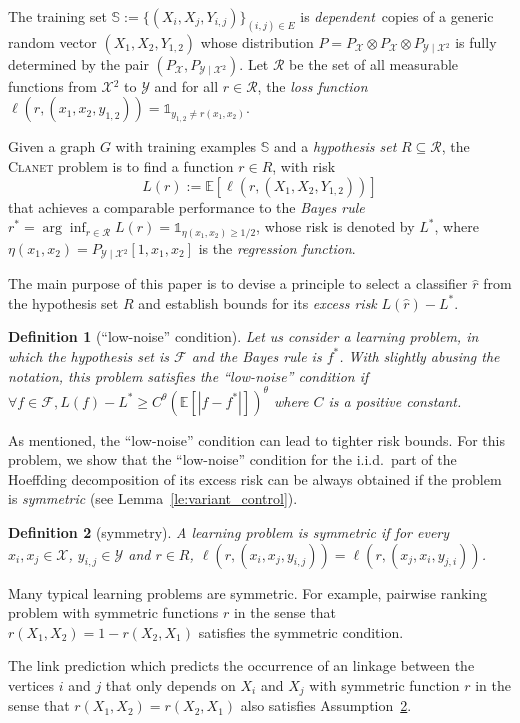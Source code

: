\documentclass[letterpaper]{article} %
\def\LongVersion{}
\def\LongVersionEnd{}
\newtheorem{definition}{Definition}
\newcommand{\E}{\mathbb{E}}
\newcommand{\indicator}{\mathds 1}
\newcommand{\xspace}{\mathcal{X}}
\newcommand{\yspace}{\mathcal{Y}}
\newcommand{\bayeserror}{L^*}
\newcommand{\distribution}{P}
\newcommand{\risk}{L}
\newcommand{\lossf}{\ell}
\newcommand{\pair}[1]{(#1)}
\newcommand{\problemabbr}{\textnormal{C}\textsc{lanet}}
\newcommand{\trainingset}{\mathbb{S}}
\begin{document}
The training set $\trainingset:=\{(X_i,X_j,Y_{i,j})\}_{\pair{i,j}\in E}$ is \emph{dependent}\ copies of a generic random vector $(X_1, X_2, Y_{1,2})$ whose distribution $\distribution{}=P_\xspace\otimes P_\xspace\otimes P_{\yspace{}\mid\xspace{}^2}$ is fully determined by the pair $(P_\xspace{}, P_{\yspace{}\mid\xspace{}^2})$. 
Let $\mathcal{R}$ be the set of all measurable functions from $\xspace{}^2$ to $\yspace{}$ and for all $r\in\mathcal{R}$, the \emph{loss function} $\ell(r,(x_1,x_2,y_{1,2}))=\indicator_{y_{1,2}\neq r(x_1,x_2)}$. 

Given a graph $G$ with training examples $\trainingset$ and a \emph{hypothesis set}  $R\subseteq\mathcal{R}$, the \problemabbr{} problem is to find a function $r\in R$, with risk
\begin{equation}
    \label{eq:graph_reconstruction_risk}
    \risk(r) := \E[\ell(r, (X_1,X_2,Y_{1,2}))]
\end{equation}
that achieves a comparable performance to the \emph{Bayes rule} $r^*=\arg\inf_{r\in\mathcal{R}}\risk(r) = \indicator_{\eta(x_1,x_2)\ge 1/2}$, whose risk is denoted by $\bayeserror{}$, where $\eta(x_1,x_2)=P_{\yspace{}\mid\xspace{}^2}[1,x_1,x_2]$ is the \emph{regression function}. 

The main purpose of this paper is to devise a principle to select a classifier $\hat{r}$ from the hypothesis set $R$ and establish bounds for its \emph{excess risk} $\risk(\hat{r}) - \bayeserror{}$.
\begin{definition}[``low-noise'' condition]
  \label{de:low-noise condition}
  Let us consider a learning problem, in which the hypothesis set is $\mathcal{F}$ and the Bayes rule is $f^*$. With slightly abusing the notation, this problem satisfies the ``low-noise'' condition if $\forall f\in \mathcal{F}, \risk{}(f) - \bayeserror{}\ge C^\theta(\E[|f-f^*|])^\theta$ where $C$ is a positive constant.
\end{definition}
As mentioned, the ``low-noise'' condition can lead to tighter risk bounds.
For this problem, we show that the ``low-noise'' condition for the i.i.d.\ part of the Hoeffding decomposition \cite{hoeffding1948class} of its excess risk can be always obtained if the problem is \emph{symmetric} (see Lemma~\ref{le:variant_control}).
\begin{definition}[symmetry]
    \label{con:symmetric}
    A learning problem is symmetric if for every $x_i,x_j\in \xspace{}$, $y_{i,j}\in \yspace{}$ and $r\in R$, $\lossf(r, (x_i,x_j,y_{i,j})) = \lossf(r, (x_j,x_i,y_{j,i}))$.
\end{definition}
Many typical learning problems are symmetric.
For example, pairwise ranking problem with symmetric functions $r$ in the sense that $r(X_1,X_2)=1-r(X_2,X_1)$ satisfies the symmetric condition. 
\LongVersion
The link prediction which predicts the occurrence of an linkage between the vertices $i$ and $j$ that only depends on $X_i$ and $X_j$ with symmetric function $r$ in the sense that $r(X_1,X_2)=r(X_2,X_1)$ also satisfies Assumption~\ref{con:symmetric}.
\LongVersionEnd
\end{document}
